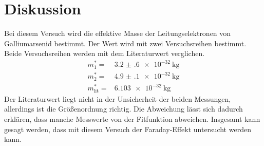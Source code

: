 \section{Diskussion}
\label{sec:Diskussion}
Bei diesem Versuch wird die effektive Masse der Leitungselektronen von Galliumarsenid bestimmt.
Der Wert wird mit zwei Versuchsreihen bestimmt. 
Beide Versuchsreihen werden mit dem Literaturwert \cite{LitWert} verglichen.
\begin{align*}
    m^*_1 =& \SI{3.2(6)e-32}{\kilo\gram}\\
    m^*_2 =& \SI{4.9(1)e-32}{\kilo\gram}\\
    m^*_{\text{lit}}=& \SI{6.103e-32}{\kilo\gram}
\end{align*}
Der Literaturwert liegt nicht in der Unsicherheit der beiden Messungen, allerdings ist die Größenordnung richtig.
Die Abweichung lässt sich dadurch erklären, dass manche Messwerte von der Fitfunktion abweichen. Insgesamt kann gesagt werden, 
dass mit diesem Versuch der Faraday-Effekt untersucht werden kann.

